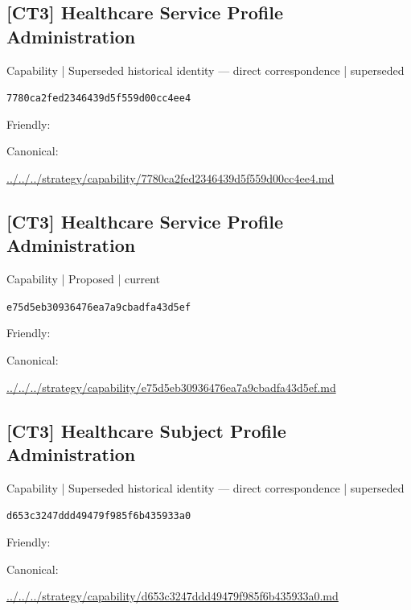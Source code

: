 \documentclass[10pt,a4paper]{article}
\begin{document}
\subsection*{[CT3] Healthcare Service Profile Administration}
{\small Capability | Superseded historical identity — direct correspondence | superseded}\par
\texttt{7780ca2fed2346439d5f559d00cc4ee4}\par
Friendly: \par
Canonical: \par
{\footnotesize\url{../../../strategy/capability/7780ca2fed2346439d5f559d00cc4ee4.md}}\par
\subsection*{[CT3] Healthcare Service Profile Administration}
{\small Capability | Proposed | current}\par
\texttt{e75d5eb30936476ea7a9cbadfa43d5ef}\par
Friendly: \par
Canonical: \par
{\footnotesize\url{../../../strategy/capability/e75d5eb30936476ea7a9cbadfa43d5ef.md}}\par
\subsection*{[CT3] Healthcare Subject Profile Administration}
{\small Capability | Superseded historical identity — direct correspondence | superseded}\par
\texttt{d653c3247ddd49479f985f6b435933a0}\par
Friendly: \par
Canonical: \par
{\footnotesize\url{../../../strategy/capability/d653c3247ddd49479f985f6b435933a0.md}}\par
\end{document}

